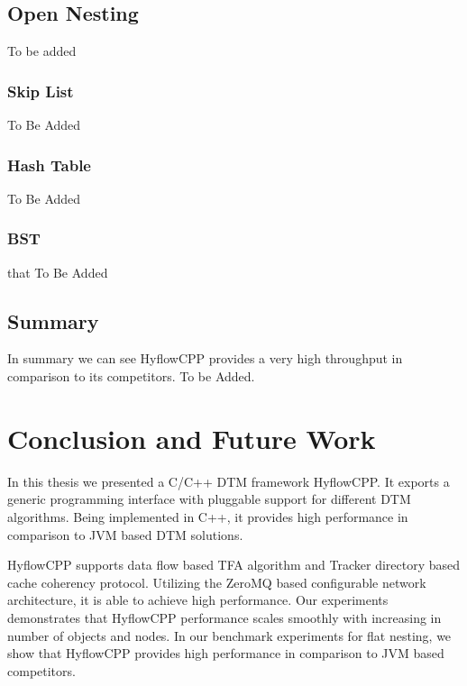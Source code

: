 \documentclass[12pt,english]{report}
\begin{document}
\section{Open Nesting}

To be added

\subsection{Skip List}

To Be Added 

\subsection{Hash Table}

To Be Added 

\subsection{BST}
that
To Be Added

\section{Summary}

In summary we can see HyflowCPP provides a very high throughput in comparison to its competitors.
To be Added.

\chapter{Conclusion and Future Work}\label{chap:conclusion}

In this thesis we presented a C/C++ DTM framework HyflowCPP. It exports a generic programming interface with pluggable support for different DTM algorithms. Being implemented in C++, it provides high performance in comparison to JVM based DTM solutions. 

HyflowCPP supports data flow based TFA algorithm and Tracker directory based cache coherency protocol. Utilizing the ZeroMQ based configurable network architecture, it is able to achieve high performance. Our experiments demonstrates that HyflowCPP performance scales smoothly with increasing in number of objects and nodes. In our benchmark experiments for flat nesting, we show that HyflowCPP provides high performance in comparison to JVM based competitors.
\end{document}
